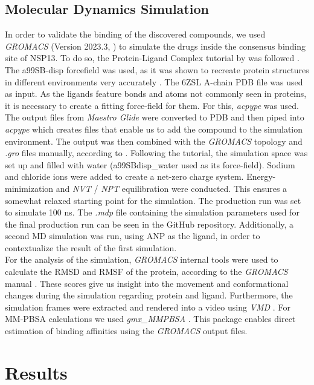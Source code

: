 \documentclass[11pt, letterpaper, titlepage]{article}
\renewcommand{\cite}{\parencite}
\begin{document}
\subsection{Molecular Dynamics Simulation}
In order to validate the binding of the discovered compounds, we used \textit{GROMACS} (Version 2023.3, \textcite{packageGROMACS}) to simulate the drugs inside the consensus binding site of NSP13. To do so, the Protein-Ligand Complex tutorial by  was followed \cite{Lemkul2018}. The a99SB-disp forcefield was used, as it was shown to recreate protein structures in different environments very accurately \cite{Forcefield}. The 6ZSL A-chain PDB file was used as input. 
As the ligands feature bonds and atoms not commonly seen in proteins, it is necessary to create a fitting force-field for them. For this, \textit{acpype} \cite{acpype} was used. The output files from \textit{Maestro Glide} were converted to PDB and then piped into \textit{acpype} which creates files that enable us to add the compound to the simulation environment. The output was then combined with the \textit{GROMACS} topology and \textit{.gro} files manually, according to .
Following the tutorial, the simulation space was set up and filled with water (a99SBdisp\_water used as its force-field). Sodium and chloride ions were added to create a net-zero charge system. Energy-minimization and \textit{NVT} / \textit{NPT} equilibration were conducted. This ensures a somewhat relaxed starting point for the simulation. The production run was set to simulate 100 ns. The \textit{.mdp} file containing the simulation parameters used for the final production run can be seen in the GitHub repository. Additionally, a second \ac{MD} simulation was run, using ANP as the ligand, in order to contextualize the result of the first simulation.\\
For the analysis of the simulation, \textit{GROMACS} internal tools were used to calculate the RMSD and RMSF of the protein, according to the \textit{GROMACS} manual \cite{packageGROMACS}. These scores give us insight into the movement and conformational changes during the simulation regarding protein and ligand. Furthermore, the simulation frames were extracted and rendered into a video using \textit{VMD} \cite{VMD}. For MM-PBSA calculations we used \textit{gmx\_MMPBSA} \cite{MMPBSA1}. This package enables direct estimation of binding affinities using the \textit{GROMACS} output files.

\section{Results}
\end{document}
